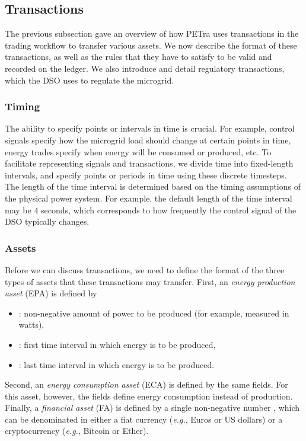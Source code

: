 \subsection{Transactions}

The previous subsection gave an overview of how PETra uses
transactions in the trading workflow to transfer various assets.  We
now describe the format of these transactions, as well as the rules
that they have to satisfy to be valid and recorded on the ledger.  We
also introduce and detail regulatory transactions, which the DSO uses
to regulate the microgrid.

\subsubsection{Timing}
The ability to specify points or intervals in time is crucial.  For
example, control signals specify how the microgrid load should change
at certain points in time, energy trades specify when energy will be
consumed or produced, etc.  To facilitate representing signals and
transactions, we divide time into fixed-length intervals, and specify
points or periods in time using these discrete timesteps.  The length
of the time interval is determined based on the timing assumptions of
the physical power system.  For example, the default length of the
time interval may be 4 seconds, which corresponds to how frequently
the control signal of the DSO typically changes.      

\subsubsection{Assets}
Before we can discuss transactions, we need to define the format of
the three types of assets that these transactions may transfer.
First, an \emph{energy production asset} (EPA) is defined by
\begin{itemize}[noitemsep,topsep=-\parskip]
\item {}: non-negative amount of power to be produced (for example, measured in watts),
\item {}: first time interval in which energy is to be produced,
\item {}: last time interval in which energy is to be produced.
\end{itemize}
\vspace{\parskip} Second, an \emph{energy consumption asset} (ECA) is
defined by the same fields.  For this asset, however, the fields
define energy consumption instead of production.  Finally, a
\emph{financial asset} (FA) is defined by a single non-negative number
, which can be denominated in either a fiat currency
(\emph{e.g.}, Euros or US dollars) or a cryptocurrency (\emph{e.g.},
Bitcoin or Ether).

